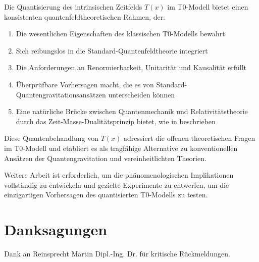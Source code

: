 \documentclass[12pt,a4paper]{article}
\newenvironment{acknowledgments}
{\section*{Danksagungen}}
{\vspace{1em}}
\newcommand{\Tfield}{T(x)}
\begin{document}
	Die Quantisierung des intrinsischen Zeitfelds $\Tfield$ im T0-Modell bietet einen konsistenten quantenfeldtheoretischen Rahmen, der:
	
	\begin{enumerate}
		\item Die wesentlichen Eigenschaften des klassischen T0-Modells bewahrt
		\item Sich reibungslos in die Standard-Quantenfeldtheorie integriert
		\item Die Anforderungen an Renormierbarkeit, Unitarität und Kausalität erfüllt
		\item Überprüfbare Vorhersagen macht, die es von Standard-Quantengravitationsansätzen unterscheiden können
		\item Eine natürliche Brücke zwischen Quantenmechanik und Relativitätstheorie durch das Zeit-Masse-Dualitätsprinzip bietet, wie in \cite{pascher_vereinheitlichung_2025} beschrieben
	\end{enumerate}
	
	Diese Quantenbehandlung von $\Tfield$ adressiert die offenen theoretischen Fragen im T0-Modell und etabliert es als tragfähige Alternative zu konventionellen Ansätzen der Quantengravitation und vereinheitlichten Theorien.
	
	Weitere Arbeit ist erforderlich, um die phänomenologischen Implikationen vollständig zu entwickeln und gezielte Experimente zu entwerfen, um die einzigartigen Vorhersagen des quantisierten T0-Modells zu testen.
	
	\begin{acknowledgments}
		Dank an Reinsprecht Martin Dipl.-Ing. Dr. für kritische Rückmeldungen.
	\end{acknowledgments}
	
\end{document}
